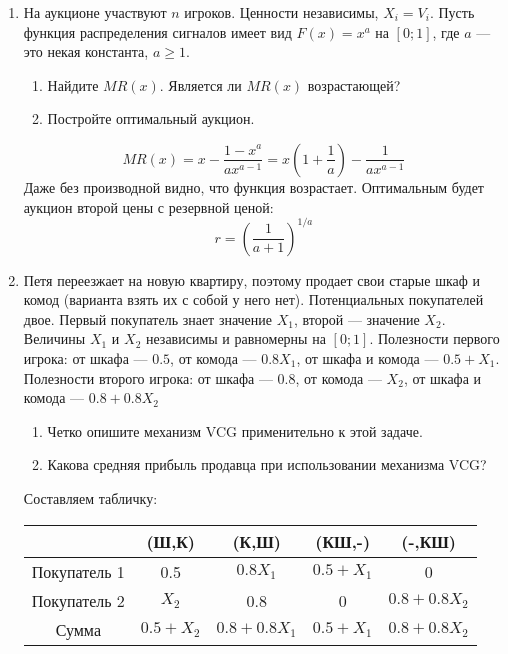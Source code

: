 \begin{enumerate}

\item На аукционе участвуют $ n $ игроков. Ценности независимы, $ X_{i}=V_{i}$. Пусть функция распределения сигналов имеет вид $ F(x)=x^{a} $ на $ [0;1] $, где $ a $ — это некая константа, $ a\geq 1 $. 
\begin{enumerate}
\item Найдите $ MR(x) $. Является ли $ MR(x) $ возрастающей?
\item Постройте оптимальный аукцион.
\end{enumerate}

\begin{equation}
MR(x)=x-\frac{1-x^{a}}{ax^{a-1}}=x\left(1+\frac{1}{a}\right)-\frac{1}{ax^{a-1}}
\end{equation}
Даже без производной видно, что функция возрастает. Оптимальным будет аукцион второй цены с резервной ценой:
\begin{equation}
r=\left(\frac{1}{a+1}\right)^{1/a}
\end{equation}

\item Петя переезжает на новую квартиру, поэтому продает свои старые шкаф и комод (варианта взять их с собой у него нет).  Потенциальных покупателей двое. Первый покупатель знает значение $ X_{1} $, второй — значение $ X_{2} $. Величины  $ X_{1} $ и  $ X_{2} $ независимы и равномерны на $ [0;1] $. Полезности первого игрока: от шкафа — $ 0.5 $, от комода — $ 0.8X_{1} $, от шкафа и комода — $ 0.5+X_{1} $. Полезности второго игрока: от шкафа — $ 0.8 $, от комода — $ X_{2} $, от шкафа и комода — $ 0.8+0.8X_{2}$
\begin{enumerate}
\item Четко опишите механизм VCG применительно к этой задаче.
\item Какова средняя прибыль продавца при использовании механизма VCG?
\end{enumerate}

Составляем табличку:

\begin{tabular}{c|cccc}
& (Ш,К) & (К,Ш) & (КШ,-) & (-,КШ) \\ 
\hline 
Покупатель 1 & 0.5 & $ 0.8X_{1} $ & $ 0.5+X_{1} $ & 0 \\ 
Покупатель 2 & $ X_{2} $ & 0.8 & 0 & $ 0.8+0.8X_{2} $ \\ 
Сумма & $ 0.5+X_{2} $& $ 0.8+0.8X_{1} $ & $ 0.5+X_{1} $ & $ 0.8+0.8X_{2} $ \\
\end{tabular} 


\end{enumerate}
